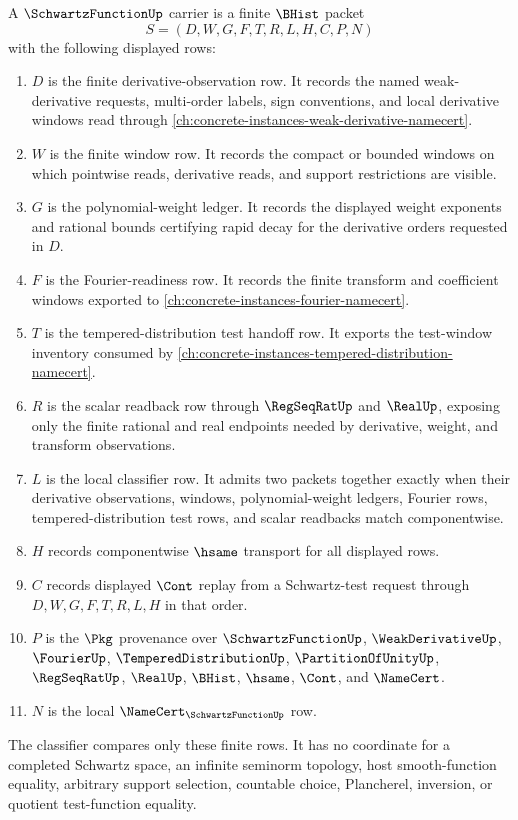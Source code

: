 \begin{definition}
\label{def:schwartz-function-carrier}
A $\SchwartzFunctionUp$ carrier is a finite $\BHist$ packet
$$
S=(D,W,G,F,T,R,L,H,C,P,N)
$$
with the following displayed rows:
\begin{enumerate}
\item $D$ is the finite derivative-observation row. It records the named weak-derivative requests, multi-order labels, sign conventions, and local derivative windows read through \autoref{ch:concrete-instances-weak-derivative-namecert}.
\item $W$ is the finite window row. It records the compact or bounded windows on which pointwise reads, derivative reads, and support restrictions are visible.
\item $G$ is the polynomial-weight ledger. It records the displayed weight exponents and rational bounds certifying rapid decay for the derivative orders requested in $D$.
\item $F$ is the Fourier-readiness row. It records the finite transform and coefficient windows exported to \autoref{ch:concrete-instances-fourier-namecert}.
\item $T$ is the tempered-distribution test handoff row. It exports the test-window inventory consumed by \autoref{ch:concrete-instances-tempered-distribution-namecert}.
\item $R$ is the scalar readback row through $\RegSeqRatUp$ and $\RealUp$, exposing only the finite rational and real endpoints needed by derivative, weight, and transform observations.
\item $L$ is the local classifier row. It admits two packets together exactly when their derivative observations, windows, polynomial-weight ledgers, Fourier rows, tempered-distribution test rows, and scalar readbacks match componentwise.
\item $H$ records componentwise $\hsame$ transport for all displayed rows.
\item $C$ records displayed $\Cont$ replay from a Schwartz-test request through $D,W,G,F,T,R,L,H$ in that order.
\item $P$ is the $\Pkg$ provenance over $\SchwartzFunctionUp$, $\WeakDerivativeUp$, $\FourierUp$, $\TemperedDistributionUp$, $\PartitionOfUnityUp$, $\RegSeqRatUp$, $\RealUp$, $\BHist$, $\hsame$, $\Cont$, and $\NameCert$.
\item $N$ is the local $\NameCert_{\SchwartzFunctionUp}$ row.
\end{enumerate}
The classifier compares only these finite rows. It has no coordinate for a completed Schwartz space, an infinite seminorm topology, host smooth-function equality, arbitrary support selection, countable choice, Plancherel, inversion, or quotient test-function equality.
\end{definition}

